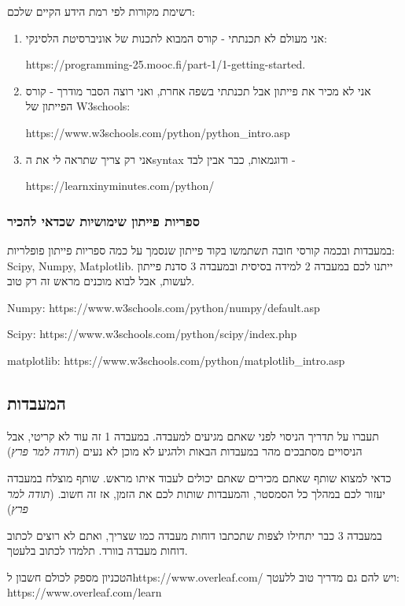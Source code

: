 \documentclass[a4paper,12pt]{article}
\begin{document}
רשימת מקורות לפי רמת הידע הקיים שלכם:

\begin{enumerate}
    \item אני מעולם לא תכנתתי - קורס המבוא לתכנות של אוניברסיטת הלסינקי: 
    
    \textenglish{https://programming-25.mooc.fi/part-1/1-getting-started}.  
    \item אני לא מכיר את פייתון אבל תכנתתי בשפה אחרת, ואני רוצה הסבר מודרך - קורס הפייתון של \textenglish{W3schools}: 
    
    \textenglish{https://www.w3schools.com/python/python\_intro.asp}
    \item אני רק צריך שתראה לי את ה\textenglish{syntax} ודוגמאות, כבר אבין לבד - 
    
    \textenglish{https://learnxinyminutes.com/python/}
\end{enumerate}

\subsubsection{ספריות פייתון שימושיות שכדאי להכיר}

במעבדות ובכמה קורסי חובה תשתמשו בקוד פייתון שנסמך על כמה ספריות פייתון פופלריות: \textenglish{Scipy, Numpy, Matplotlib}. ייתנו לכם במעבדה 2 למידה בסיסית ובמעבדה 3 סדנת פייתון לעשות, אבל לבוא מוכנים מראש זה רק טוב.

\textenglish{Numpy: https://www.w3schools.com/python/numpy/default.asp}

\textenglish{Scipy: https://www.w3schools.com/python/scipy/index.php}

\textenglish{matplotlib: https://www.w3schools.com/python/matplotlib\_intro.asp}

\subsection{המעבדות}

תעברו על תדריך הניסוי לפני שאתם מגיעים למעבדה. במעבדה 1 זה עוד לא קריטי, אבל הניסויים מסתבכים מהר במעבדות הבאות ולהגיע לא מוכן לא נעים (\emph{תודה למר פרץ})

כדאי למצוא שותף שאתם מכירים שאתם יכולים לעבוד איתו מראש. שותף מוצלח במעבדה יעזור לכם במהלך כל הסמסטר, והמעבדות שותות לכם את הזמן, אז זה חשוב. (\emph{תודה למר פרץ})

במעבדה 3 כבר יתחילו לצפות שתכתבו דוחות מעבדה כמו שצריך, ואתם לא רוצים לכתוב דוחות מעבדה בוורד. תלמדו לכתוב בלעטך.

הטכניון מספק לכולם חשבון ל\textenglish{https://www.overleaf.com/} ויש להם גם מדריך טוב ללעטך:
\textenglish{https://www.overleaf.com/learn}
\end{document}
